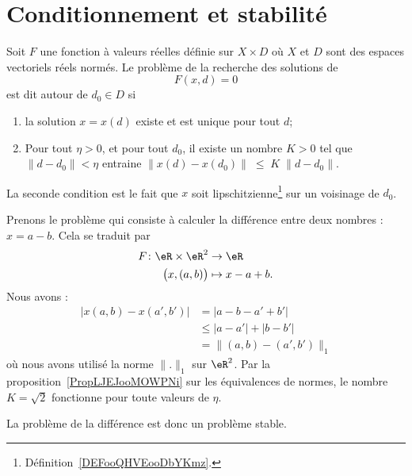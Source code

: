 \section{Conditionnement et stabilité}

\begin{definition}      \label{DEFooYIFAooSJbMkC}
	Soit \( F\) une fonction à valeurs réelles définie sur \( X\times D\) où \( X\) et \( D\) sont des espaces vectoriels réels normés. Le problème de la recherche des solutions de
	\begin{equation}
		F(x,d)=0
	\end{equation}
	est dit  autour de \( d_0\in D\) si
	\begin{enumerate}
		\item
		      la solution \( x=x(d)\) existe et est unique pour tout \( d\);
		\item \label{ItemProbStableB}
		      Pour tout \( \eta>0\), et pour tout \( d_0\), il existe un nombre \( K>0\) tel que \( \| d-d_0\|<\eta\) entraine \( \|x(d)-x(d_0)\|\;\leq\;K\;\|d-d_0\|\).
	\end{enumerate}
	La seconde condition est le fait que \( x\) soit lipschitzienne\footnote{Définition~\ref{DEFooQHVEooDbYKmz}.} sur un voisinage de \( d_0\).
\end{definition}

\begin{example}    \label{ExooXJONooTAYZVc}
	Prenons le problème qui consiste à calculer la différence entre deux nombres : \( x=a-b\). Cela se traduit par
	\begin{equation}
		\begin{aligned}
			F\colon \eR\times \eR^2 & \to \eR        \\
			\big( x,(a,b) \big)     & \mapsto x-a+b.
		\end{aligned}
	\end{equation}
	Nous avons :
	\begin{subequations}
		\begin{align}
			\big| x(a,b)-x(a',b') \big| & =| a-b-a'+b' |           \\
			                            & \leq| a-a' |+| b-b' |    \\
			                            & =\|  (a,b)-(a',b')  \|_1
		\end{align}
	\end{subequations}
	où nous avons utilisé la norme \( \| . \|_1\) sur \( \eR^2\). Par la proposition~\ref{PropLJEJooMOWPNi} sur les équivalences de normes, le nombre \( K=\sqrt{2}\) fonctionne pour toute valeurs de \( \eta\).

	La problème de la différence est donc un problème stable.
\end{example}

